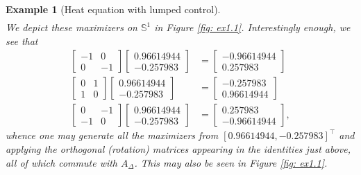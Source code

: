 \documentclass[journal,twoside,web]{ieeecolor}
\newtheorem{example}{Example}
\begin{document}
\begin{example}[Heat equation with lumped control]
\begin{align}
	\end{align}
	We depict these maximizers on $\mathbb{S}^1$ in Figure \ref{fig: ex1.1}.
	Interestingly enough, we see that
	\begin{align*}
	\begin{bmatrix}-1&0\\0&-1\end{bmatrix}\begin{bmatrix} 0.96614944\\-0.257983\end{bmatrix} &= \begin{bmatrix} -0.96614944\\0.257983\end{bmatrix}\\
	\begin{bmatrix}0&1\\1&0\end{bmatrix}\begin{bmatrix} 0.96614944\\-0.257983\end{bmatrix} &= \begin{bmatrix} -0.257983\\0.96614944\end{bmatrix}\\
	\begin{bmatrix}0&-1\\-1&0\end{bmatrix}\begin{bmatrix} 0.96614944\\-0.257983\end{bmatrix} &= \begin{bmatrix} 0.257983\\-0.96614944\end{bmatrix},
	\end{align*}
	whence one may generate all the maximizers from $[0.96614944, -0.257983]^\top$ and applying the orthogonal (rotation) matrices appearing in the identities just above,
	all of which commute with $A_\Delta$. This may also be seen in Figure \ref{fig: ex1.1}.
		

\end{example}
\end{document}
